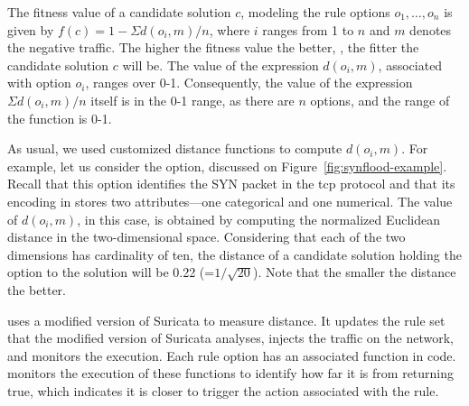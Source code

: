 \documentclass[runningheads]{llncs}
\begin{document}
The fitness value of a candidate solution $c$, modeling the rule
options $o_1, \dots, o_n$ is given by $f(c)=1-\Sigma{d(o_i,m)}/n$,
where $i$ ranges from 1 to $n$ and $m$ denotes the negative
traffic. The higher the fitness value the better, \ie{}, the fitter
the candidate solution $c$ will be.  The value of the expression
$d(o_i,m)$, associated with option $o_i$, ranges over
0-1. Consequently, the value of the expression $\Sigma{d(o_i,m)}/n$
itself is in the 0-1 range, as there are $n$ options, and the range of
the function is 0-1.

As usual, we used customized distance functions to compute $d(o_i,
m)$. For example, let us consider the  option, discussed
on Figure~\ref{fig:synflood-example}. Recall that this option
identifies the SYN packet in the tcp protocol and that its encoding in
\tname{} stores two attributes---one categorical and one
numerical. The value of $d(o_i, m)$, in this case, is obtained by
computing the normalized Euclidean distance in the two-dimensional
space. Considering that each of the two dimensions has cardinality of
ten, the distance of a candidate solution holding the option
 to the solution will be 0.22
(=$1/\sqrt{20}$). Note that the smaller the distance the better.

\tname{} uses a modified version of Suricata to measure distance. It
updates the rule set that the modified version of Suricata analyses,
injects the traffic on the network, and monitors the execution. Each
rule option has an associated  function in code. \tname{}
monitors the execution of these functions to identify how far it is
from returning true, which indicates it is closer to trigger the
action associated with the rule. 
\end{document}
